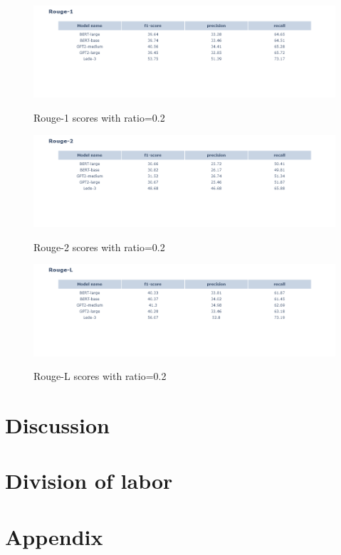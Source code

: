 \documentclass{article}
\begin{document}
\begin{figure}
	\centering
	\hspace*{-3cm}
	\includegraphics[scale=0.55]{rouge1.png}\\
	\caption{Rouge-1 scores with ratio=0.2}
	\label{fig:rouge1_02}
\end{figure}



\begin{figure}
	\centering
	\hspace*{-3cm}
	\includegraphics[scale=0.55]{rouge2.png}\\
	\caption{Rouge-2 scores with ratio=0.2}
	\label{fig:rouge2_02}
\end{figure}

\begin{figure}
	\centering
	\hspace*{-3cm}
	\includegraphics[scale=0.55]{rougel.png}\\
	\caption{Rouge-L scores with ratio=0.2}
	\label{fig:rougel_02}
\end{figure}



\section{Discussion}




\section{Division of labor}


\section{Appendix}


\end{document}
